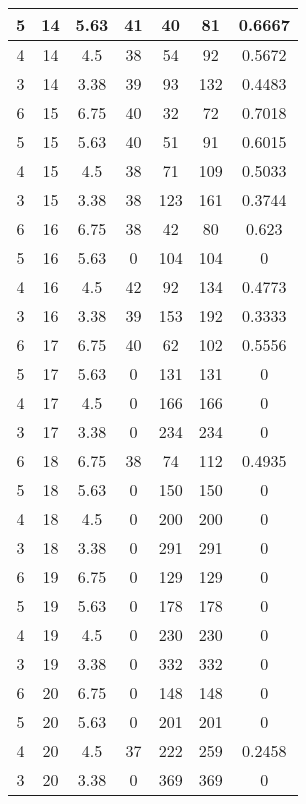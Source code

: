 \documentclass[letterpaper, 12pt]{article}
\begin{document}
\begin{longtable}{|c|c|c|c|c|c|c|}
\hline
5 & 14 & 5.63 & 41 & 40 & 81 & 0.6667 \\
\hline
4 & 14 & 4.5 & 38 & 54 & 92 & 0.5672 \\
\hline
3 & 14 & 3.38 & 39 & 93 & 132 & 0.4483 \\
\hline
6 & 15 & 6.75 & 40 & 32 & 72 & 0.7018 \\
\hline
5 & 15 & 5.63 & 40 & 51 & 91 & 0.6015 \\
\hline
4 & 15 & 4.5 & 38 & 71 & 109 & 0.5033 \\
\hline
3 & 15 & 3.38 & 38 & 123 & 161 & 0.3744 \\
\hline
6 & 16 & 6.75 & 38 & 42 & 80 & 0.623 \\
\hline
5 & 16 & 5.63 & 0 & 104 & 104 & 0 \\
\hline
4 & 16 & 4.5 & 42 & 92 & 134 & 0.4773 \\
\hline
3 & 16 & 3.38 & 39 & 153 & 192 & 0.3333 \\
\hline
6 & 17 & 6.75 & 40 & 62 & 102 & 0.5556 \\
\hline
5 & 17 & 5.63 & 0 & 131 & 131 & 0 \\
\hline
4 & 17 & 4.5 & 0 & 166 & 166 & 0 \\
\hline
3 & 17 & 3.38 & 0 & 234 & 234 & 0 \\
\hline
6 & 18 & 6.75 & 38 & 74 & 112 & 0.4935 \\
\hline
5 & 18 & 5.63 & 0 & 150 & 150 & 0 \\
\hline
4 & 18 & 4.5 & 0 & 200 & 200 & 0 \\
\hline
3 & 18 & 3.38 & 0 & 291 & 291 & 0 \\
\hline
6 & 19 & 6.75 & 0 & 129 & 129 & 0 \\
\hline
5 & 19 & 5.63 & 0 & 178 & 178 & 0 \\
\hline
4 & 19 & 4.5 & 0 & 230 & 230 & 0 \\
\hline
3 & 19 & 3.38 & 0 & 332 & 332 & 0 \\
\hline
6 & 20 & 6.75 & 0 & 148 & 148 & 0 \\
\hline
5 & 20 & 5.63 & 0 & 201 & 201 & 0 \\
\hline
4 & 20 & 4.5 & 37 & 222 & 259 & 0.2458 \\
\hline
3 & 20 & 3.38 & 0 & 369 & 369 & 0 \\
\hline
\end{longtable}
\end{document}
